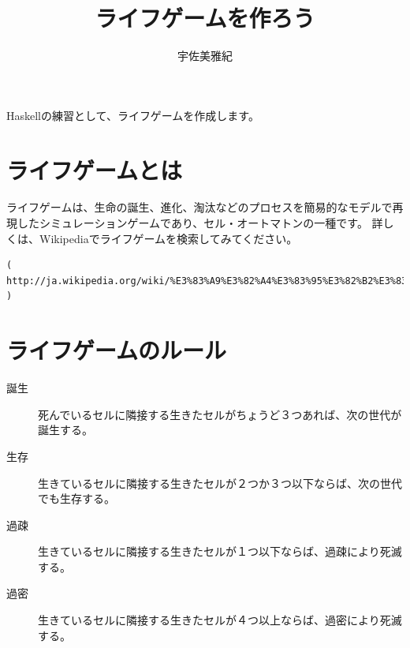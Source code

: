 \documentclass{jsarticle}
\begin{document}
\title{ライフゲームを作ろう}
\author{宇佐美雅紀}
\maketitle

Haskellの練習として、ライフゲームを作成します。

\section{ライフゲームとは}
ライフゲームは、生命の誕生、進化、淘汰などのプロセスを簡易的なモデルで再現したシミュレーションゲームであり、セル・オートマトンの一種です。
詳しくは、Wikipediaでライフゲームを検索してみてください。
\begin{verbatim}
( http://ja.wikipedia.org/wiki/%E3%83%A9%E3%82%A4%E3%83%95%E3%82%B2%E3%83%BC%E3%83%A0 )
\end{verbatim}

\section{ライフゲームのルール}

\begin{description}
 \item[誕生] 死んでいるセルに隣接する生きたセルがちょうど３つあれば、次の世代が誕生する。
 \item[生存] 生きているセルに隣接する生きたセルが２つか３つ以下ならば、次の世代でも生存する。
 \item[過疎] 生きているセルに隣接する生きたセルが１つ以下ならば、過疎により死滅する。
 \item[過密] 生きているセルに隣接する生きたセルが４つ以上ならば、過密により死滅する。
\end{description}
\end{document}
